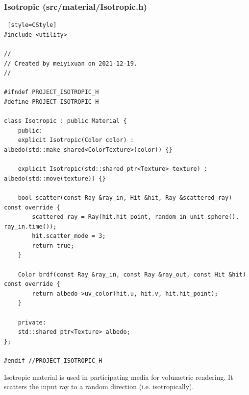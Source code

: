 \documentclass[utf8]{article}
\begin{document}
\subsubsection{Isotropic (src/material/Isotropic.h)}
\begin{lstlisting} [style=CStyle]
#include <utility>

//
// Created by meiyixuan on 2021-12-19.
//

#ifndef PROJECT_ISOTROPIC_H
#define PROJECT_ISOTROPIC_H

class Isotropic : public Material {
	public:
	explicit Isotropic(Color color) : albedo(std::make_shared<ColorTexture>(color)) {}
	
	explicit Isotropic(std::shared_ptr<Texture> texture) : albedo(std::move(texture)) {}
	
	bool scatter(const Ray &ray_in, Hit &hit, Ray &scattered_ray) const override {
		scattered_ray = Ray(hit.hit_point, random_in_unit_sphere(), ray_in.time());
		hit.scatter_mode = 3;
		return true;
	}
	
	Color brdf(const Ray &ray_in, const Ray &ray_out, const Hit &hit) const override {
		return albedo->uv_color(hit.u, hit.v, hit.hit_point);
	}
	
	private:
	std::shared_ptr<Texture> albedo;
};

#endif //PROJECT_ISOTROPIC_H

\end{lstlisting}
Isotropic material is used in participating media for volumetric rendering. It scatters the input ray to a random direction (i.e. isotropically).
\end{document}
